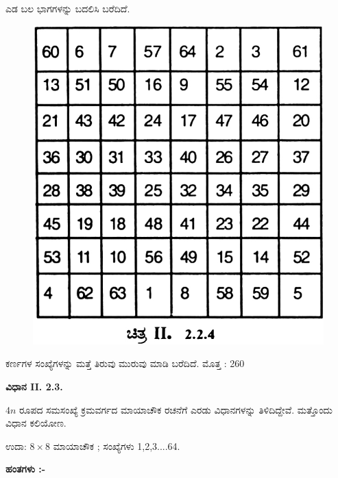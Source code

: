\begin{itemize}
\begin{figure}[H]
	\end{figure}
	ಎಡ ಬಲ ಭಾಗಗಳನ್ನು ಬದಲಿಸಿ ಬರೆದಿದೆ.
	\begin{figure}[H]
	\includegraphics[scale=.9]{src/figures/chap3/fig3-23.jpg}
	\end{figure}
	ಕರ್ಣಗಳ ಸಂಖ್ಯೆಗಳನ್ನು ಮತ್ತೆ ತಿರುವು ಮುರುವು ಮಾಡಿ ಬರೆದಿದೆ. ಮೊತ್ತ : 260
\end{itemize}

\noindent \textbf{ವಿಧಾನ II. 2.3.}

$4n$ ರೂಪದ ಸಮಸಂಖ್ಯೆ ಕ್ರಮವರ್ಗದ ಮಾಯಾಚೌಕ ರಚನೆಗೆ ಎರಡು ವಿಧಾನಗಳನ್ನು ತಿಳಿದಿದ್ದೇವೆ. ಮತ್ತೊಂದು ವಿಧಾನ ಕಲಿಯೋಣ.

ಉದಾ: $8 \times 8$ ಮಾಯಾಚೌಕ ; ಸಂಖ್ಯೆಗಳು 1,2,3....64.

\medskip
\noindent \textbf{ಹಂತಗಳು :-}

